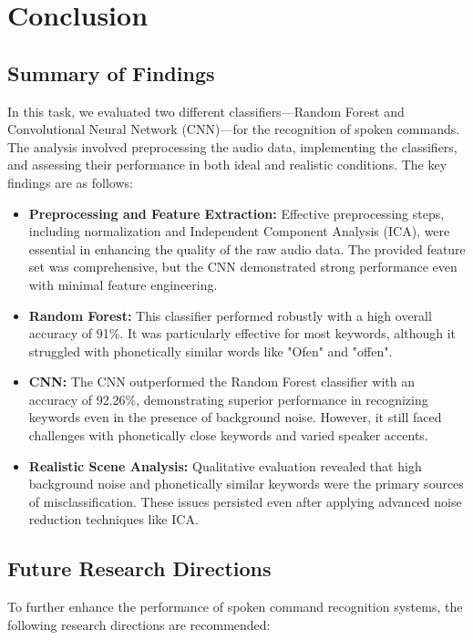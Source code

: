 \section{Conclusion}

\subsection{Summary of Findings}
In this task, we evaluated two different classifiers—Random Forest and Convolutional Neural Network (CNN)—for the recognition of spoken commands. The analysis involved preprocessing the audio data, implementing the classifiers, and assessing their performance in both ideal and realistic conditions. The key findings are as follows:

\begin{itemize}
    \item \textbf{Preprocessing and Feature Extraction:} Effective preprocessing steps, including normalization and Independent Component Analysis (ICA), were essential in enhancing the quality of the raw audio data. The provided feature set was comprehensive, but the CNN demonstrated strong performance even with minimal feature engineering.

    \item \textbf{Random Forest:} This classifier performed robustly with a high overall accuracy of 91\%. It was particularly effective for most keywords, although it struggled with phonetically similar words like "Ofen" and "offen".

    \item \textbf{CNN:} The CNN outperformed the Random Forest classifier with an accuracy of 92.26\%, demonstrating superior performance in recognizing keywords even in the presence of background noise. However, it still faced challenges with phonetically close keywords and varied speaker accents.

    \item \textbf{Realistic Scene Analysis:} Qualitative evaluation revealed that high background noise and phonetically similar keywords were the primary sources of misclassification. These issues persisted even after applying advanced noise reduction techniques like ICA.
\end{itemize}

\subsection{Future Research Directions}
To further enhance the performance of spoken command recognition systems, the following research directions are recommended:

